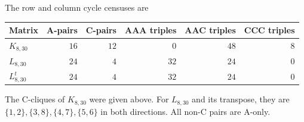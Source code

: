 \documentclass[11pt,a4paper]{article}
\theoremstyle{plain}
\theoremstyle{definition}
\numberwithin{equation}{section}
\begin{document}
The row and column cycle censuses are
\begin{center}\begin{tabular}{lrrrrr}\toprule
Matrix&A-pairs&C-pairs&AAA triples&AAC triples&CCC triples\\\midrule
$K_{8,30}$&$16$&$12$&$0$&$48$&$8$\\
$L_{8,30}$&$24$&$4$&$32$&$24$&$0$\\
$L_{8,30}^{t}$&$24$&$4$&$32$&$24$&$0$\\
\bottomrule\end{tabular}\end{center}
The C-cliques of $K_{8,30}$ were given above. For $L_{8,30}$ and its transpose, they are $\{1,2\},\allowbreak\{3,8\},\allowbreak\{4,7\},\allowbreak\{5,6\}$ in both directions. All non-C pairs are A-only.
\end{document}
